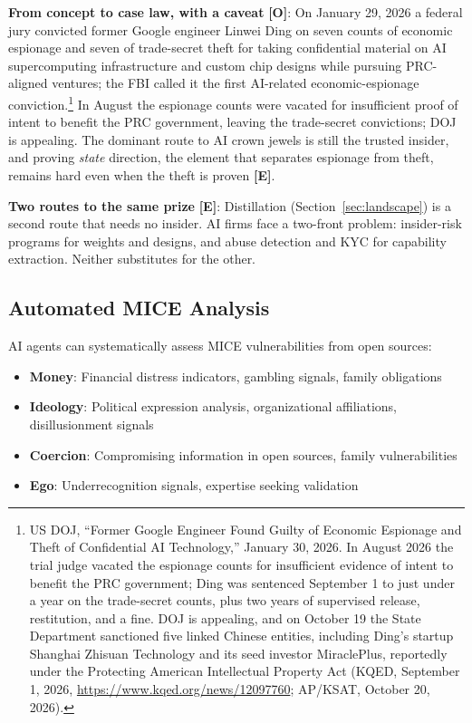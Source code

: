 \documentclass[11pt,letterpaper]{article}
\begin{document}
\textbf{From concept to case law, with a caveat} \textbf{[O]}: On January 29, 2026 a federal jury convicted former Google engineer Linwei Ding on seven counts of economic espionage and seven of trade-secret theft for taking confidential material on AI supercomputing infrastructure and custom chip designs while pursuing PRC-aligned ventures; the FBI called it the first AI-related economic-espionage conviction.\footnote{US DOJ, ``Former Google Engineer Found Guilty of Economic Espionage and Theft of Confidential AI Technology,'' January 30, 2026. In August 2026 the trial judge vacated the espionage counts for insufficient evidence of intent to benefit the PRC government; Ding was sentenced September 1 to just under a year on the trade-secret counts, plus two years of supervised release, restitution, and a fine. DOJ is appealing, and on October 19 the State Department sanctioned five linked Chinese entities, including Ding's startup Shanghai Zhisuan Technology and its seed investor MiraclePlus, reportedly under the Protecting American Intellectual Property Act (KQED, September 1, 2026, \url{https://www.kqed.org/news/12097760}; AP/KSAT, October 20, 2026).} In August the espionage counts were vacated for insufficient proof of intent to benefit the PRC government, leaving the trade-secret convictions; DOJ is appealing. The dominant route to AI crown jewels is still the trusted insider, and proving \textit{state} direction, the element that separates espionage from theft, remains hard even when the theft is proven \textbf{[E]}.

\textbf{Two routes to the same prize} \textbf{[E]}: Distillation (Section~\ref{sec:landscape}) is a second route that needs no insider. AI firms face a two-front problem: insider-risk programs for weights and designs, and abuse detection and KYC for capability extraction. Neither substitutes for the other.

\subsection{Automated MICE Analysis}

AI agents can systematically assess MICE vulnerabilities from open sources:

\begin{itemize}
  \item \textbf{Money}: Financial distress indicators, gambling signals, family obligations
  \item \textbf{Ideology}: Political expression analysis, organizational affiliations, disillusionment signals
  \item \textbf{Coercion}: Compromising information in open sources, family vulnerabilities
  \item \textbf{Ego}: Underrecognition signals, expertise seeking validation
\end{itemize}
\end{document}

